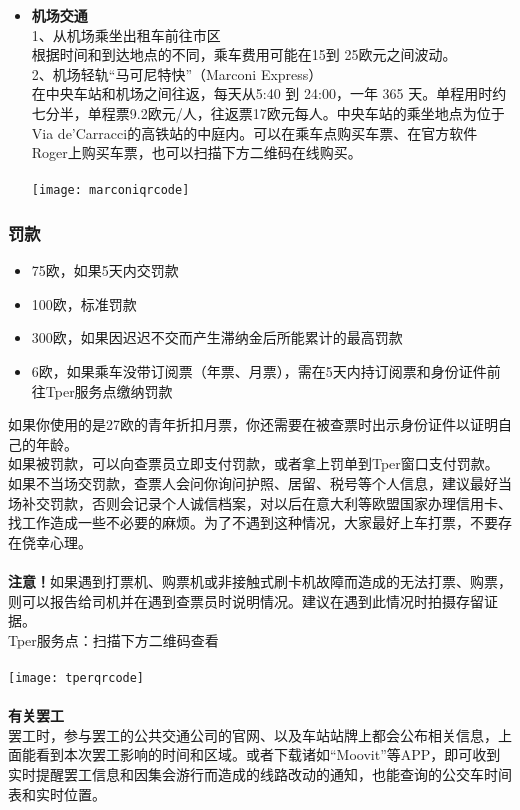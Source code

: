 \begin{itemize}
\item  \textbf{机场交通}\\
1、从机场乘坐出租车前往市区\\
根据时间和到达地点的不同，乘车费用可能在15到 25欧元之间波动。\\
2、机场轻轨“马可尼特快”（Marconi Express）\\
在中央车站和机场之间往返，每天从5:40 到 24:00，一年 365 天。单程用时约七分半，单程票9.2欧元/人，往返票17欧元每人。中央车站的乘坐地点为位于Via de'Carracci的高铁站的中庭内。可以在乘车点购买车票、在官方软件Roger上购买车票，也可以扫描下方二维码在线购买。\\
\\
\texttt{[image: marconiqrcode]}


\end{itemize}


\subsubsection{罚款}
\begin{itemize}
\item  75欧，如果5天内交罚款
\item  100欧，标准罚款
\item  300欧，如果因迟迟不交而产生滞纳金后所能累计的最高罚款
\item  6欧，如果乘车没带订阅票（年票、月票），需在5天内持订阅票和身份证件前往Tper服务点缴纳罚款
\end{itemize}
如果你使用的是27欧的青年折扣月票，你还需要在被查票时出示身份证件以证明自己的年龄。\\
如果被罚款，可以向查票员立即支付罚款，或者拿上罚单到Tper窗口支付罚款。如果不当场交罚款，查票人会问你询问护照、居留、税号等个人信息，建议最好当场补交罚款，否则会记录个人诚信档案，对以后在意大利等欧盟国家办理信用卡、找工作造成一些不必要的麻烦。为了不遇到这种情况，大家最好上车打票，不要存在侥幸心理。\\
\\
\textbf{注意！}如果遇到打票机、购票机或非接触式刷卡机故障而造成的无法打票、购票，则可以报告给司机并在遇到查票员时说明情况。建议在遇到此情况时拍摄存留证据。\\
Tper服务点：扫描下方二维码查看\\
\\
\texttt{[image: tperqrcode]}
\\
\\
\textbf{有关罢工}\\
罢工时，参与罢工的公共交通公司的官网、以及车站站牌上都会公布相关信息，上面能看到本次罢工影响的时间和区域。或者下载诸如“Moovit”等APP，即可收到实时提醒罢工信息和因集会游行而造成的线路改动的通知，也能查询的公交车时间表和实时位置。\\



